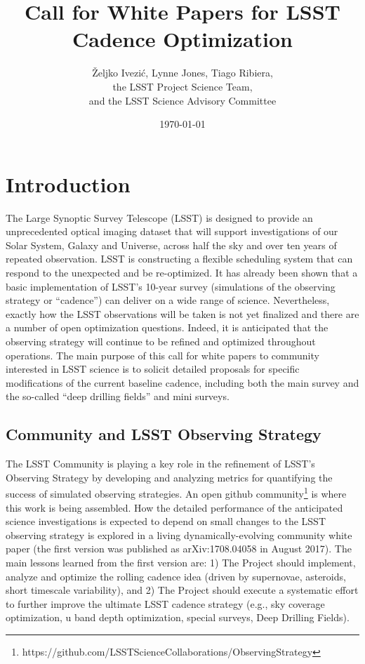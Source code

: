 \documentclass[DM,lsstdraft,toc,usenatbib]{lsstdoc}
\title[Call for LSST Cadence White Papers]{Call for White Papers for LSST Cadence Optimization}
\author{\v{Z}eljko Ivezi\'{c}, Lynne Jones, Tiago Ribiera, 
             \\  the LSST Project Science Team, 
              \\ and  the LSST Science Advisory Committee}
\date{\today}
\begin{document}
\maketitle

\section{Introduction} 

The Large Synoptic Survey Telescope (LSST) is designed to provide an unprecedented optical 
imaging dataset that will support investigations of our Solar System, Galaxy and Universe, 
across half the sky and over ten years of repeated observation. LSST is constructing a 
flexible scheduling system that can respond to the unexpected and be re-optimized. 
It has already been shown that a basic implementation of LSST's 10-year survey (simulations of 
the observing strategy or ``cadence'') can deliver on a wide range of science. 
Nevertheless, exactly how the LSST observations will be taken is not yet finalized and there
are a number of open optimization questions. Indeed, it is anticipated that the observing strategy 
will continue to be refined and optimized throughout operations. The main purpose of this 
call for white papers to community interested in LSST science is to solicit detailed proposals
for specific modifications of the current baseline cadence, including both the main survey and 
the so-called ``deep drilling fields'' and mini surveys. 


\subsection{Community and LSST Observing Strategy}

The LSST Community is playing a key role in the refinement of LSST’s Observing Strategy by 
developing and analyzing metrics for quantifying the success of simulated observing strategies.
An open github community\footnote{
https://github.com/LSSTScienceCollaborations/ObservingStrategy}
is where this work is being assembled. How the detailed performance of the anticipated 
science investigations is expected to depend on small changes to the LSST observing 
strategy is explored in a living dynamically-evolving community white paper (the first
version was published as arXiv:1708.04058 in August 2017). The main lessons 
learned from the first version are: 1) The Project should implement, analyze and optimize 
the rolling cadence idea (driven by supernovae, asteroids, short timescale variability),
and 2) The Project should execute a systematic effort to further improve the ultimate 
LSST cadence strategy (e.g., sky coverage optimization, u band depth optimization, special 
surveys, Deep Drilling Fields). 
\end{document}
